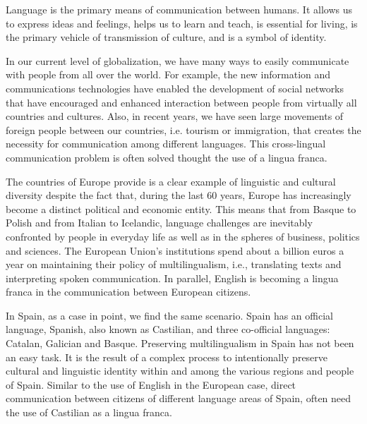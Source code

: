 \begin{multicols}{2}
    
Language is the primary means of communication between humans. It allows us to express ideas and feelings, helps us to learn and teach, is essential for living, is the primary vehicle of transmission of culture, and is a symbol of identity.

    
In our current level of globalization, we have many ways to easily communicate with people from all over the world. For example, the new information and communications technologies have enabled the development of social networks that have encouraged and enhanced interaction between people from virtually all countries and cultures. Also, in recent years, we have seen large movements of foreign people between our countries, i.e. tourism or immigration, that creates the necessity for communication among different languages. This cross-lingual communication problem is often solved thought the use of a lingua franca.

The countries of Europe provide is a clear example of linguistic and cultural diversity despite the fact that, during the last 60 years, Europe has increasingly become a distinct political and economic entity. This means that from Basque to Polish and from Italian to Icelandic, language challenges are inevitably confronted by people in everyday life as well as in the spheres of business, politics and sciences. The European Union’s institutions spend about a billion euros a year on maintaining their policy of multilingualism, i.e., translating texts and interpreting spoken communication. In parallel, English is becoming a lingua franca in the communication between European citizens.

In Spain, as a case in point, we find the same scenario. Spain has an official language, Spanish, also known as Castilian, and three co-official languages: Catalan, Galician and Basque. Preserving multilingualism in Spain has not been an easy task. It is the result of a complex process to intentionally preserve cultural and linguistic identity within and among the various regions and people of Spain. Similar to the use of English in the European case, direct communication between citizens of different language areas of Spain, often need the use of Castilian as a lingua franca.



\end{multicols}

